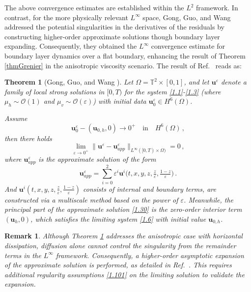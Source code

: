 \documentclass[pdflatex,sn-mathphys-num]{sn-jnl}%
\theoremstyle{thmstyleone}%
\newtheorem{theorem}{Theorem}%
\theoremstyle{thmstyletwo}%
\newtheorem{remark}{Remark}%
\theoremstyle{thmstylethree}%
\theoremstyle{thmstyletwo}
\begin{document}
The above convergence estimates are established within the $L^2$ framework.
In contrast, for the more physically relevant $L^\infty$ space, Gong, Guo, and Wang \cite{Gong2015} 
addressed the potential singularities in the derivatives of the residuals by constructing higher-order approximate solutions though boundary layer expanding.
Consequently, they obtained the $L^\infty$ convergence estimate for boundary layer dynamics over a flat boundary, enhancing the result of Theorem \ref{thmGrenier} in the anisotropic viscosity scenario.  
The result of Ref.~\cite{Gong2015}  reads as:
\begin{theorem}[Gong, Guo, and Wang \cite{Gong2015}]\label{thgong}
	Let $\Omega=\mathbb{T}^2\times[0,1]$, and let $\boldsymbol{u}^\varepsilon$ denote a family of local strong solutions in $[0, T)$ for the system \eqref{1.1}-\eqref{1.3} (where $\mu_h \sim \mathcal{O}(1)$ and $\mu_v \sim \mathcal{O}(\varepsilon)$) with initial data $\boldsymbol{u}^\varepsilon_0 \in H^6(\Omega)$.
	
	Assume
	\begin{equation}\label{1.101}
		\boldsymbol{u}^\varepsilon_{0}-(\boldsymbol{u}_{0,h},0)\rightarrow 0^+\quad\text{in}\quad  H^6(\Omega)\,,
	\end{equation} 
	then there holds
	\begin{equation}\label{1.10} \lim\limits_{\varepsilon\rightarrow0^+}
		\Big\lVert
		\boldsymbol{u}^\varepsilon
		-
		\boldsymbol{u}_{app}^\varepsilon
		\Big\rVert_{{L}^{\infty}([0,T)\times\Omega)}=0\,,
	\end{equation}
	where $\boldsymbol{u}_{app}^\varepsilon$ is the approximate solution of the form
	\begin{equation}\label{1.30}
		\boldsymbol{u}_{app}^\varepsilon= \sum^{2}_{i=0}\varepsilon^i \boldsymbol{u}^i\big(t,x,y,z,\tfrac{z}{\varepsilon},\tfrac{1-z}{\varepsilon}\big)\,.
	\end{equation}  
	And $\boldsymbol{u}^i(t,x,y,z,\frac{z}{\varepsilon},\frac{1-z}{\varepsilon})$ consists of internal and boundary terms, are constructed via a multiscale method based on the power of $\varepsilon$.
	Meanwhile, the principal part of the approximate solution \eqref{1.30} is the zero-order  interior term $(\boldsymbol{u}_h,0)$, which satisfies the limiting system \eqref{1.6} with initial value $\boldsymbol{u}_{0,h}$.	
\end{theorem}
 \begin{remark}
Although Theorem \ref{thgong} addresses the anisotropic case with horizontal dissipation, diffusion alone cannot control the singularity from the remainder terms in the $L^\infty$ framework. Consequently, a higher-order asymptotic expansion of the approximate solution is performed, as detailed in Ref.~\cite{Gong2015}. This requires additional regularity assumptions \eqref{1.101} on the limiting solution to validate the expansion.
 \end{remark}
\end{document}
